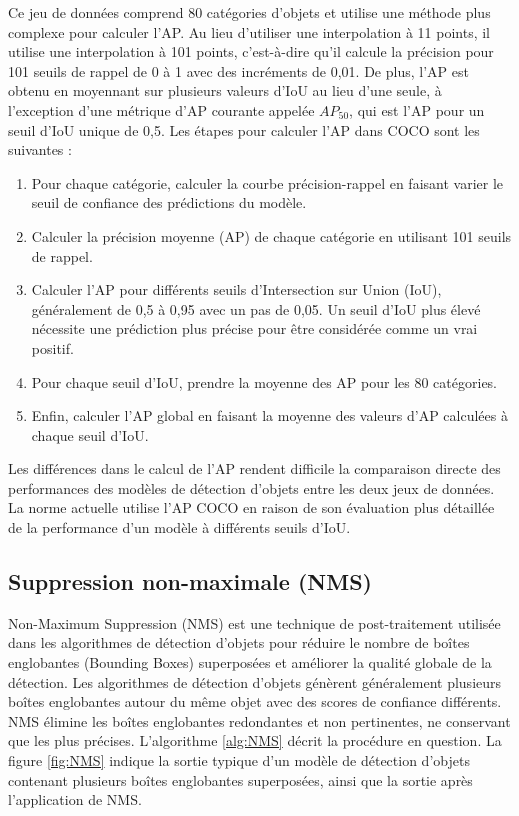 \documentclass{article}
\begin{document}
Ce jeu de données comprend 80 catégories d'objets et utilise une méthode plus complexe pour calculer l'AP. Au lieu d'utiliser une interpolation à 11 points, il utilise une interpolation à 101 points, c'est-à-dire qu'il calcule la précision pour 101 seuils de rappel de 0 à 1 avec des incréments de 0,01. De plus, l'AP est obtenu en moyennant sur plusieurs valeurs d'IoU au lieu d'une seule, à l'exception d'une métrique d'AP courante appelée {$AP_{50}$}, qui est l'AP pour un seuil d'IoU unique de 0,5. Les étapes pour calculer l'AP dans COCO sont les suivantes :
\begin{enumerate}
    \item Pour chaque catégorie, calculer la courbe précision-rappel en faisant varier le seuil de confiance des prédictions du modèle.
    \item Calculer la précision moyenne (AP) de chaque catégorie en utilisant 101 seuils de rappel.
    \item Calculer l'AP pour différents seuils d'Intersection sur Union (IoU), généralement de 0,5 à 0,95 avec un pas de 0,05. Un seuil d'IoU plus élevé nécessite une prédiction plus précise pour être considérée comme un vrai positif.
    \item Pour chaque seuil d'IoU, prendre la moyenne des AP pour les 80 catégories.
    \item Enfin, calculer l'AP global en faisant la moyenne des valeurs d'AP calculées à chaque seuil d'IoU.
\end{enumerate}
Les différences dans le calcul de l'AP rendent difficile la comparaison directe des performances des modèles de détection d'objets entre les deux jeux de données. La norme actuelle utilise l'AP COCO en raison de son évaluation plus détaillée de la performance d'un modèle à différents seuils d'IoU.



\subsection{Suppression non-maximale (NMS)}
Non-Maximum Suppression (NMS) est une technique de post-traitement utilisée dans les algorithmes de détection d'objets pour réduire le nombre de boîtes englobantes (Bounding Boxes) superposées et améliorer la qualité globale de la détection. Les algorithmes de détection d'objets génèrent généralement plusieurs boîtes englobantes autour du même objet avec des scores de confiance différents. NMS élimine les boîtes englobantes redondantes et non pertinentes, ne conservant que les plus précises. L'algorithme \ref{alg:NMS} décrit la procédure en question. La figure \ref{fig:NMS} indique la sortie typique d'un modèle de détection d'objets contenant plusieurs boîtes englobantes superposées, ainsi que la sortie après l'application de NMS.
\end{document}

